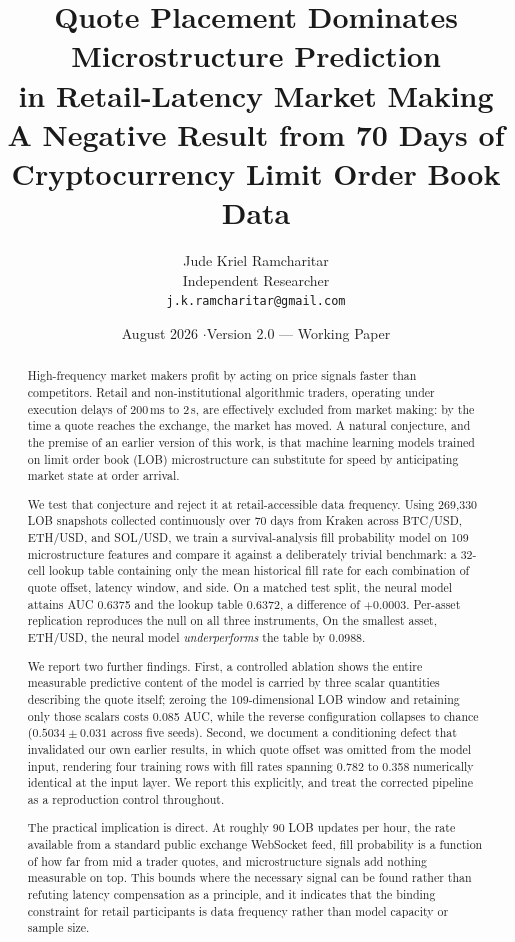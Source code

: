 \documentclass[11pt]{article}
\title{\textbf{Quote Placement Dominates Microstructure Prediction\\
in Retail-Latency Market Making}\\[0.4em]
\large A Negative Result from 70 Days of Cryptocurrency Limit Order Book Data}
\author{Jude Kriel Ramcharitar\\
\small Independent Researcher\\
\small \texttt{j.k.ramcharitar@gmail.com}}
\date{August 2026 \quad$\cdot$\quad Version 2.0 --- Working Paper}
\begin{document}
\maketitle

\begin{abstract}
\noindent
High-frequency market makers profit by acting on price signals faster than
competitors. Retail and non-institutional algorithmic traders, operating under
execution delays of 200\,ms to 2\,s, are effectively excluded from market making:
by the time a quote reaches the exchange, the market has moved. A natural
conjecture, and the premise of an earlier version of this work, is that
machine learning models trained on limit order book (LOB) microstructure can
substitute for speed by anticipating market state at order arrival.

We test that conjecture and reject it at retail-accessible data frequency. Using
269{,}330 LOB snapshots collected continuously over 70 days from Kraken across
BTC/USD, ETH/USD, and SOL/USD, we train a survival-analysis fill probability
model on 109 microstructure features and compare it against a deliberately
trivial benchmark: a 32-cell lookup table containing only the mean historical
fill rate for each combination of quote offset, latency window, and side. On a
matched test split, the neural model attains AUC 0.6375 and the lookup table
0.6372, a difference of $+0.0003$. Per-asset replication reproduces the null
on all three instruments, On the smallest asset, ETH/USD, the neural model \emph{underperforms} the
table by 0.0988.

We report two further findings. First, a controlled ablation shows the entire
measurable predictive content of the model is carried by three scalar quantities
describing the quote itself; zeroing the 109-dimensional LOB window and
retaining only those scalars costs 0.085 AUC, while the reverse configuration
collapses to chance ($0.5034 \pm 0.031$ across five seeds). Second, we document
a conditioning defect that invalidated our own earlier results, in which quote
offset was omitted from the model input, rendering four training rows with fill
rates spanning 0.782 to 0.358 numerically identical at the input layer. We
report this explicitly, and treat the corrected pipeline as a reproduction
control throughout.

The practical implication is direct. At roughly 90 LOB updates per hour, the
rate available from a standard public exchange WebSocket feed, fill probability
is a function of how far from mid a trader quotes, and microstructure signals
add nothing measurable on top. This bounds where the necessary signal can be
found rather than refuting latency compensation as a principle, and it indicates
that the binding constraint for retail participants is data frequency rather
than model capacity or sample size.


\end{abstract}
\end{document}
